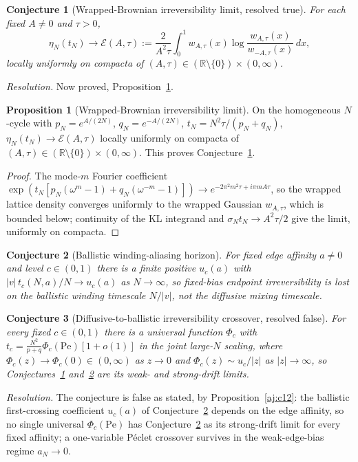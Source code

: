 \documentclass[11pt]{article}
\newtheorem{conjecture}{Conjecture}
\theoremstyle{definition}
\newcommand{\R}{\mathbb R}
\providecommand{\R}{\mathbb R}
\newtheorem{proposition}{Proposition}
\begin{document}
\begin{conjecture}[Wrapped-Brownian irreversibility limit, resolved true]\label{aj10}
For each fixed $A\neq0$ and $\tau>0$,
\[
\eta_N(t_N)\longrightarrow\mathcal E(A,\tau):=\frac2{A^2\tau}\int_0^1w_{A,\tau}(x)\log\frac{w_{A,\tau}(x)}{w_{-A,\tau}(x)}\,dx,
\]
locally uniformly on compacta of $(A,\tau)\in(\R\setminus\{0\})\times(0,\infty)$.
\end{conjecture}

\emph{Resolution.} Now proved, Proposition~\ref{aj:wrapped}.

\begin{proposition}[Wrapped-Brownian irreversibility limit]\label{aj:wrapped}
On the homogeneous $N$-cycle with $p_N=e^{A/(2N)}$, $q_N=e^{-A/(2N)}$, $t_N=N^2\tau/(p_N+q_N)$, $\eta_N(t_N)\to\mathcal E(A,\tau)$ locally uniformly on compacta of $(A,\tau)\in(\R\setminus\{0\})\times(0,\infty)$.  This proves Conjecture~\ref{aj10}.
\end{proposition}

\begin{proof}
The mode-$m$ Fourier coefficient $\exp(t_N[p_N(\omega^m-1)+q_N(\omega^{-m}-1)])\to e^{-2\pi^2m^2\tau+i\pi mA\tau}$, so the wrapped lattice density converges uniformly to the wrapped Gaussian $w_{A,\tau}$, which is bounded below; continuity of the KL integrand and $\sigma_Nt_N\to A^2\tau/2$ give the limit, uniformly on compacta.
\end{proof}

\begin{conjecture}[Ballistic winding-aliasing horizon]\label{aj11}
For fixed edge affinity $a\neq0$ and level $c\in(0,1)$ there is a finite positive $u_c(a)$ with $|v|\,t_c(N,a)/N\to u_c(a)$ as $N\to\infty$, so fixed-bias endpoint irreversibility is lost on the ballistic winding timescale $N/|v|$, not the diffusive mixing timescale.
\end{conjecture}

\begin{conjecture}[Diffusive-to-ballistic irreversibility crossover, resolved false]\label{aj12}
For every fixed $c\in(0,1)$ there is a universal function $\Phi_c$ with $t_c=\tfrac{N^2}{p+q}\Phi_c(\mathrm{Pe})[1+o(1)]$ in the joint large-$N$ scaling, where $\Phi_c(z)\to\Phi_c(0)\in(0,\infty)$ as $z\to0$ and $\Phi_c(z)\sim u_c/|z|$ as $|z|\to\infty$, so Conjectures~\ref{aj10} and~\ref{aj11} are its weak- and strong-drift limits.
\end{conjecture}

\emph{Resolution.} The conjecture is false as stated, by Proposition~\ref{aj:c12}: the ballistic first-crossing coefficient $u_c(a)$ of Conjecture~\ref{aj11} depends on the edge affinity, so no single universal $\Phi_c(\mathrm{Pe})$ has Conjecture~\ref{aj11} as its strong-drift limit for every fixed affinity; a one-variable P\'eclet crossover survives in the weak-edge-bias regime $a_N\to0$.
\end{document}
